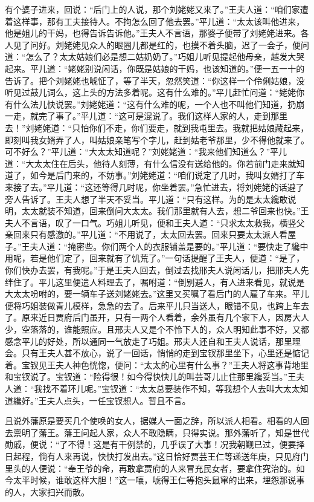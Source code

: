 \begin{parag}
    有个婆子进来，回说：“后门上的人说，那个刘姥姥又来了。”王夫人道：“咱们家遭着这样事，那有工夫接待人。不拘怎么回了他去罢。”平儿道：“太太该叫他进来，他是姐儿的干妈，也得告诉告诉他。”王夫人不言语，那婆子便带了刘姥姥进来。各人见了问好。刘姥姥见众人的眼圈儿都是红的，也摸不着头脑，迟了一会子，便问道：“怎么了？太太姑娘们必是想二姑奶奶了。”巧姐儿听见提起他母亲，越发大哭起来。平儿道：“姥姥别说闲话，你既是姑娘的干妈，也该知道的。”便一五一十的告诉了。把个刘姥姥也唬怔了，等了半天，忽然笑道：“你这样一个伶俐姑娘，没听见过鼓儿词么，这上头的方法多着呢。这有什么难的。”平儿赶忙问道：“姥姥你有什么法儿快说罢。”刘姥姥道：“这有什么难的呢，一个人也不叫他们知道，扔崩一走，就完了事了。”平儿道：“这可是混说了。我们这样人家的人，走到那里去！”刘姥姥道：“只怕你们不走，你们要走，就到我屯里去。我就把姑娘藏起来，即刻叫我女婿弄了人，叫姑娘亲笔写个字儿，赶到姑老爷那里，少不得他就来了。可不好么？”平儿道：“大太太知道呢？”刘姥姥道：“我来他们知道么？”平儿道：“大太太住在后头，他待人刻薄，有什么信没有送给他的。你若前门走来就知道了，如今是后门来的，不妨事。”刘姥姥道：“咱们说定了几时，我叫女婿打了车来接了去。”平儿道：“这还等得几时呢，你坐着罢。”急忙进去，将刘姥姥的话避了旁人告诉了。王夫人想了半天不妥当。平儿道：“只有这样。为的是太太纔敢说明，太太就装不知道，回来倒问大太太。我们那里就有人去，想二爷回来也快。”王夫人不言语，叹了一口气。巧姐儿听见，便和王夫人道：“只求太太救我，横竖父亲回来只有感激的。”平儿道：“不用说了，太太回去罢。回来只要太太派人看屋子。”王夫人道：“掩密些。你们两个人的衣服铺盖是要的。”平儿道：“要快走了纔中用呢，若是他们定了，回来就有了饥荒了。”一句话提醒了王夫人，便道：“是了，你们快办去罢，有我呢。”于是王夫人回去，倒过去找邢夫人说闲话儿，把邢夫人先绊住了。平儿这里便遣人料理去了，嘱咐道：“倒别避人，有人进来看见，就说是大太太吩咐的，要一辆车子送刘姥姥去。”这里又买嘱了看后门的人雇了车来。平儿便将巧姐装做青儿模样，急急的去了。后来平儿只当送人，眼错不见，也跨上车去了。原来近日贾府后门虽开，只有一两个人看着，余外虽有几个家下人，因房大人少，空落落的，谁能照应。且邢夫人又是个不怜下人的，众人明知此事不好，又都感念平儿的好处，所以通同一气放走了巧姐。邢夫人还自和王夫人说话，那里理会。只有王夫人甚不放心，说了一回话，悄悄的走到宝钗那里坐下，心里还是惦记着。宝钗见王夫人神色恍惚，便问：“太太的心里有什么事？”王夫人将这事背地里和宝钗说了。宝钗道：“险得很！如今得快快儿的叫芸哥儿止住那里纔妥当。”王夫人道：“我找不着环儿呢。”宝钗道：“太太总要装作不知，等我想个人去叫大太太知道纔好。”王夫人点头，一任宝钗想人。暂且不言。
\end{parag}


\begin{parag}
    且说外藩原是要买几个使唤的女人，据媒人一面之辞，所以派人相看。相看的人回去禀明了藩王。藩王问起人家，众人不敢隐瞒，只得实说。那外藩听了，知是世代勋戚，便说：“了不得！这是有干例禁的，几乎误了大事！况我朝觐已过，便要择日起程，倘有人来再说，快快打发出去。”这日恰好贾芸王仁等递送年庚，只见府门里头的人便说：“奉王爷的命，再敢拿贾府的人来冒充民女者，要拿住究治的。如今太平时候，谁敢这样大胆！”这一嚷，唬得王仁等抱头鼠窜的出来，埋怨那说事的人，大家扫兴而散。
\end{parag}


